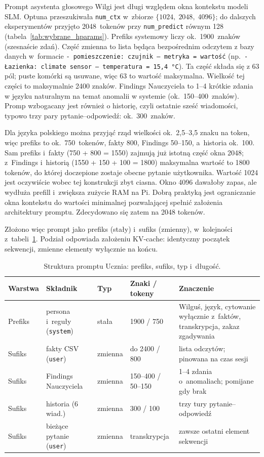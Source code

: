 Prompt asystenta głosowego Wilgi jest długi względem okna kontekstu modeli SLM.
Optuna przeszukiwała \texttt{num\_ctx} w~zbiorze $\{1024,\;2048,\;4096\}$;
do dalszych eksperymentów przyjęto 2048~tokenów przy \texttt{num\_predict}
równym 128 (tabela~\ref{tab:wybrane_hparams}). Prefiks systemowy
liczy ok.\ 1900~znaków (szesnaście zdań). Część zmienna to lista będąca bezpośrednim odczytem z bazy danych w~formacie
\texttt{- pomieszczenie: czujnik -- metryka = wartość}
(np.\ \texttt{- Łazienka: climate sensor -- temperatura = 15{,}4 °C}).
Ta część składa się z 63 pól; puste komórki są usuwane, więc 63 to wartość maksymalna. Wielkość tej części to maksymalnie 2400 znaków.
Findings Nauczyciela to 1--4 krótkie zdania w języku naturalnym na temat anomalii w systemie (ok.\ 150--400~znaków). Promp wzbogacany jest również o historię, czyli ostatnie sześć wiadomości,
typowo trzy pary pytanie--odpowiedź: ok.\ 300~znaków.

Dla języka polskiego można przyjąć rząd wielkości ok.\ 2{,}5--3{,}5 znaku
na token, więc prefiks to ok.\ 750~tokenów, fakty 800,
Findings 50--150, a~historia ok.\ 100. Sam prefiks i~fakty (750 + 800 = 1550)
    zajmują już istotną część okna 2048; z~Findings i~historią (1550 + 150 + 100 = 1800) maksymalna wartość to 1800 tokenów, do której doczepione zostaje obecne pytanie użytkownika. Wartość 1024 jest oczywiście wobec tej konstrukcji zbyt ciasna.
Okno 4096 dawałoby zapas, ale wydłuża prefill i~zwiększa zużycie RAM na Pi. Dobrą praktyką jest ograniczanie okna kontekstu do wartości minimalnej pozwalającej spełnić założenia architektury promptu. Zdecydowano się zatem na 2048 tokenów.

Złożono więc prompt jako prefiks (stały) i~sufiks (zmienny), w~kolejności
z~tabeli~\ref{tab:prompt_struktura}. Podział odpowiada założeniu KV-cache:
identyczny początek sekwencji, zmienne elementy wyłącznie na końcu.

\begin{table}[H]
  \centering
  \caption{Struktura promptu Ucznia: prefiks, sufiks, typ i~długość.}
  \label{tab:prompt_struktura}
  \small
  \begin{tabular}{llp{1.5cm}p{2.4cm}p{4.6cm}}
    \hline
    Warstwa & Składnik & Typ & Znaki / tokeny & Znaczenie \\
    \hline
    Prefiks & persona i~reguły
      (\texttt{system}) & stała
      & 1900 / 750
      & Wilguś, język, cytowanie wyłącznie z~faktów, transkrypcja, zakaz zgadywania \\
    Sufiks & fakty CSV
      (\texttt{user}) & zmienna
      & do 2400 / 800
      & lista odczytów; pinowana na czas sesji \\
    Sufiks & Findings Nauczyciela & zmienna
      & 150--400 / 50--150
      & 1--4 zdania o~anomaliach; pomijane gdy brak \\
    Sufiks & historia (6 wiad.) & zmienna
      & 300 / 100
      & trzy tury pytanie--odpowiedź \\
    Sufiks & bieżące pytanie
      (\texttt{user}) & zmienna
      & transkrypcja
      & zawsze ostatni element sekwencji \\
    \hline
  \end{tabular}
\end{table}

